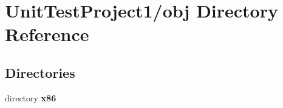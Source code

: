 \section{Unit\+Test\+Project1/obj Directory Reference}
\label{dir_e1e1776de40226e5d9d5cc7320affca3}
\subsection*{Directories}
\begin{DoxyCompactItemize}
\item 
directory \textbf{ x86}
\end{DoxyCompactItemize}
